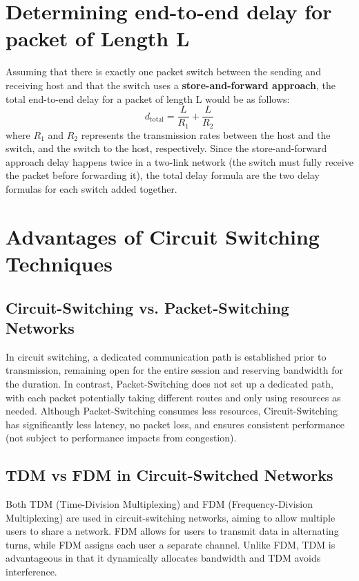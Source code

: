 \documentclass{article}
\begin{document}
\section{Determining end-to-end delay for packet of Length L}
Assuming that there is exactly one packet switch between the sending and receiving host and that the switch uses a \textbf{store-and-forward approach}, the total end-to-end delay for a packet of length L would be as follows:
\[
d_{\text{total}} = \frac{L}{R_1} + \frac{L}{R_2}
\]
where \( R_1 \) and \( R_2 \) represents the transmission rates between the host and the switch, and the switch to the host, respectively.   
Since the store-and-forward approach delay happens twice in a two-link network (the switch must fully receive the packet before forwarding it), the total delay formula are the two delay formulas for each switch added together.

\section{Advantages of Circuit Switching Techniques}
\subsection{Circuit-Switching vs. Packet-Switching Networks}
In circuit switching, a dedicated communication path is established prior to transmission, remaining open for the entire session and reserving bandwidth for the duration. In contrast, Packet-Switching does not set up a dedicated path, with each packet potentially taking different routes and only using resources as needed. Although Packet-Switching consumes less resources, Circuit-Switching has significantly less latency, no packet loss, and ensures consistent performance (not subject to performance impacts from congestion).
\subsection{TDM vs FDM in Circuit-Switched Networks}
Both TDM (Time-Division Multiplexing) and FDM (Frequency-Division Multiplexing) are used in circuit-switching networks, aiming to allow multiple users to share a network. FDM allows for users to transmit data in alternating turns, while FDM assigns each user a separate channel. Unlike FDM, TDM is advantageous in that it dynamically allocates bandwidth and TDM avoids interference. 
\setcounter{section}{19}
\end{document}

